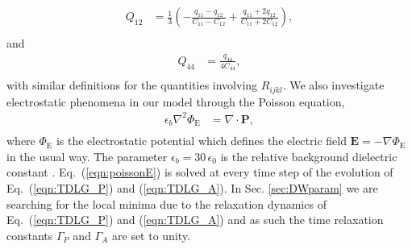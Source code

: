 \documentclass[%
 reprint,
superscriptaddress,
 amsmath,amssymb,
prb,
]{revtex4-1}
\begin{document}
%
\begin{equation}\label{eqn:eig2}
\begin{aligned}
Q_{12} &= \frac{1}{3}\left(-\frac{q_{11}-q_{12}}{C_{11}-C_{12}} + \frac{q_{11} + 2 q_{12}}{C_{11}+2 C_{12}}\right),\\
\end{aligned}
\end{equation}
%
and
%
\begin{equation}\label{eqn:eig3}
\begin{aligned}
Q_{44} &= \frac{q_{44}}{4 C_{44}},\\
\end{aligned}
\end{equation}
%
%
with similar definitions for the quantities involving $R_{ijkl}$.
%
We also investigate electrostatic phenomena in our model through the Poisson equation,
%
\begin{equation}\label{eqn:poissonE}
\begin{aligned}
    \epsilon_b \nabla^2 \Phi_\mathrm{E} &= \nabla \cdot \textbf{P}, \\
\end{aligned}
\end{equation}
%
where $\Phi_\mathrm{E}$ is the electrostatic potential which defines the electric field $\mathbf{E} = - \nabla \Phi_\mathrm{E}$ in the usual way.
%
The parameter $\epsilon_b = 30 \, \epsilon_0$ is the relative background dielectric constant \cite{Graf2015}.
%
Eq.~(\ref{eqn:poissonE}) is solved at every time step of the evolution of Eq.~(\ref{eqn:TDLG_P}) and (\ref{eqn:TDLG_A}).
%
In Sec. \ref{sec:DWparam} we are searching for the local minima due to the relaxation dynamics of Eq.~(\ref{eqn:TDLG_P}) and (\ref{eqn:TDLG_A}) and as such the time relaxation constants $\Gamma_P$ and $\Gamma_A$ are set to unity.


%
\end{document}
